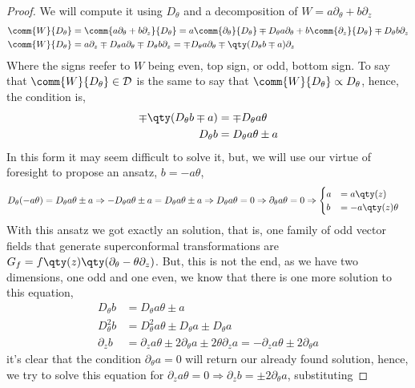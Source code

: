 \begin{proof}
We will compute it using $D_\theta$ and a decomposition of $W=a\partial_\theta+b\partial_z$
\begin{align*}
    \comm{W}{D_\theta}&=\comm{a\partial_\theta+b\partial_z}{D_\theta}=a\comm{\partial_\theta}{D_\theta}\mp D_\theta a\partial_\theta+b\comm{\partial_z}{D_\theta}\mp D_\theta b\partial_z\\
    \comm{W}{D_\theta}&=a\partial_z\mp D_\theta a\partial_\theta\mp D_\theta b\partial_z=\mp D_\theta a\partial_\theta\mp \qty(D_\theta b\mp a)\partial_z
\end{align*}
Where the signs reefer to $W$ being even, top sign, or odd, bottom sign. To say that $\comm{W}{D_\theta}\in\mathcal D$ is the same 
to say that $\comm{W}{D_\theta}\propto D_\theta$, hence, the condition is,
\begin{align*}
    \mp \qty(D_\theta b\mp a)&=\mp D_\theta a\theta\\
    D_\theta b&= D_\theta a\theta\pm a
\end{align*}
In this form it may seem difficult to solve it, but, we will use our virtue of foresight to propose an ansatz, $b=-a\theta$,
\begin{align*}
    D_\theta (-a\theta)&= D_\theta a\theta\pm a\Rightarrow -D_\theta a\theta\pm a= D_\theta a\theta\pm a\Rightarrow D_\theta a\theta=0\Rightarrow \partial_\theta a\theta=0\Rightarrow \begin{cases}a&=a\qty(z)\\b&=-a\qty(z)\theta\end{cases}
\end{align*}
With this ansatz we got exactly an solution, that is, one family of odd vector fields that generate superconformal transformations are $G_f=f\qty(z)\qty(\partial_\theta-\theta\partial_z)$. 
But, this is not the end, as we have two dimensions, one odd and one even, we know that there is one more solution to this equation,
\begin{align*}
    D_\theta b&=D_\theta a\theta\pm a\\
    D^2_\theta b&=D^2_\theta a\theta\pm D_\theta a\pm D_\theta a\\
    \partial_z b&=\partial _z a\theta \pm2\partial_\theta a\pm2\theta\partial_z a=-\partial_za\theta\pm2\partial_\theta a
\end{align*}
it's clear that the condition $\partial_\theta a=0$ will return our already found solution, hence, we try to 
solve this equation for $\partial_za\theta=0\Rightarrow \partial_z b=\pm 2\partial_\theta a$, substituting 

\end{proof}
